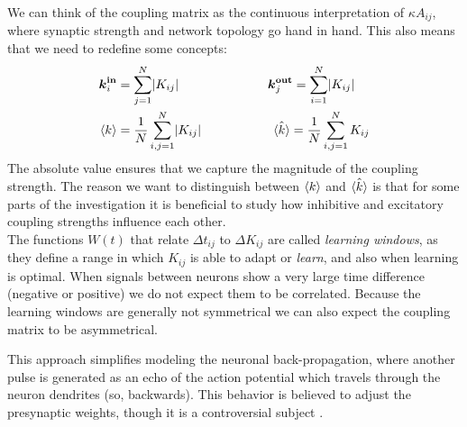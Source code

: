 We can think of the coupling matrix as the continuous interpretation of $\kappa A_{ij}$, where synaptic strength and network topology go hand in hand. This also means that we need to redefine some concepts:
\begin{alignat}{2}
\kinbi &= \sum_{j=1}^{N} \rvert K_{i j} \rvert &&\koutbj = \sum_{i=1}^{N} \rvert K_{i j} \rvert \label{eq:definekinkoutfromK} \\
\kmean &= \frac{1}{N} \sum_{i,j=1}^{N} \rvert K_{i j} \rvert \hspace{15mm} && \: \:\hat{\kmean} = \frac{1}{N} \sum_{i,j=1}^{N} K_{i j}  \label{eq:kmeanfromK} 
\end{alignat}
The absolute value ensures that we capture the magnitude of the coupling strength. The reason we want to distinguish between ${\langle k\rangle}$ and $\hat{{\langle k\rangle}}$ is that for some parts of the investigation it is beneficial to study how inhibitive and excitatory coupling strengths influence each other.\\

The functions $W(t)$ that relate $\Delta t_{ij}$ to $\Delta K_{ij}$ are called \textsl{learning windows},  as they define a range in which $K_{ij}$ is able to adapt or \textsl{learn}, and also when learning is optimal. When signals between neurons show a very large time difference (negative or positive) we do not expect them to be correlated. Because the learning windows are generally not symmetrical we can also expect the coupling matrix to be asymmetrical.




This approach simplifies modeling the neuronal back-propagation, where another pulse is generated as an echo of the action potential which travels through the neuron dendrites (so, backwards). This behavior is believed to adjust the presynaptic weights, though it is a controversial subject \cite{Gerstner2002}. \\

